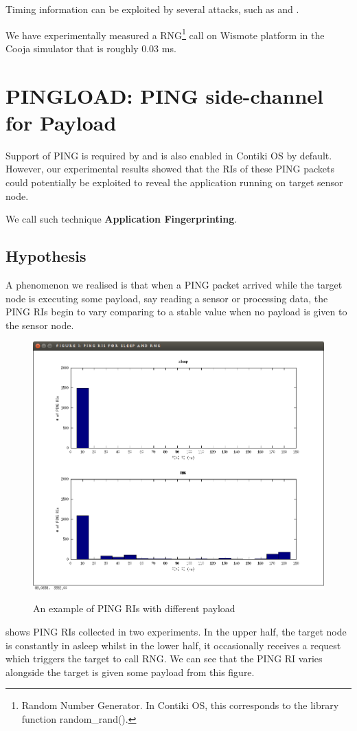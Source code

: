 Timing information can be exploited by several attacks, such as \cite{Peekaboo} and \cite{rsatiming}.

We have experimentally measured a RNG\footnote{Random Number Generator. In Contiki OS, this corresponds to the library function random\_rand().} call on Wismote platform in the Cooja simulator that is roughly 0.03 ms.

\section{PINGLOAD: PING side-channel for Payload }
Support of PING is required by \cite{rfc1122} and is also enabled in Contiki OS by default. However, our experimental results showed that the RIs of these PING packets could potentially be exploited to reveal the application running on target sensor node.

We call such technique {\bf  Application Fingerprinting}.

\subsection{Hypothesis} \label{Sec: pingload hypothesis}
A phenomenon we realised is that when a PING packet arrived while the target node is executing some payload, say reading a sensor or processing data, the PING RIs begin to vary comparing to a stable value when no payload is given to the sensor node. 

\begin{example}
\begin{figure}
\centering
{
  \includegraphics[width=1\textwidth]{fig/pingri.png}
}
\caption{An example of PING RIs with different payload}
\label{Fig: PINGLOAD RIs}
\end{figure}
 shows PING RIs collected in two experiments. In the upper half, the target node is constantly in asleep whilst in the lower half,  it occasionally receives a request which triggers the target to call RNG. We can see that the PING RI varies alongside the target is given some payload from this figure.
\end{example}

